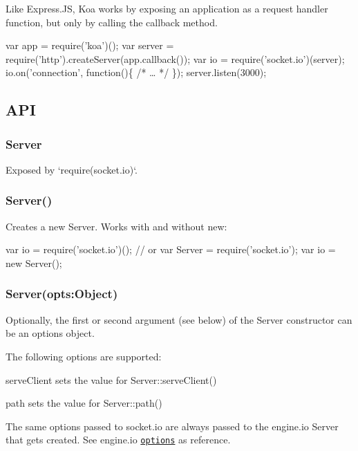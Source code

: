 Like Express.\+JS, Koa works by exposing an application as a request handler function, but only by calling the {\ttfamily callback} method.


\begin{DoxyCode}
var app = require('koa')();
var server = require('http').createServer(app.callback());
var io = require('socket.io')(server);
io.on('connection', function()\{ /* … */ \});
server.listen(3000);
\end{DoxyCode}


\subsection*{A\+PI}

\subsubsection*{Server}

Exposed by `require(\textquotesingle{}socket.\+io\textquotesingle{})`.

\subsubsection*{Server()}

Creates a new {\ttfamily Server}. Works with and without {\ttfamily new}\+:


\begin{DoxyCode}
var io = require('socket.io')();
// or
var Server = require('socket.io');
var io = new Server();
\end{DoxyCode}


\subsubsection*{Server(opts\+:\+Object)}

Optionally, the first or second argument (see below) of the {\ttfamily Server} constructor can be an options object.

The following options are supported\+:


\begin{DoxyItemize}
\item {\ttfamily serve\+Client} sets the value for Server\+::serve\+Client()
\item {\ttfamily path} sets the value for Server\+::path()
\end{DoxyItemize}

The same options passed to socket.\+io are always passed to the {\ttfamily engine.\+io} {\ttfamily Server} that gets created. See engine.\+io \href{https://github.com/socketio/engine.io#methods-1}{\tt options} as reference.

